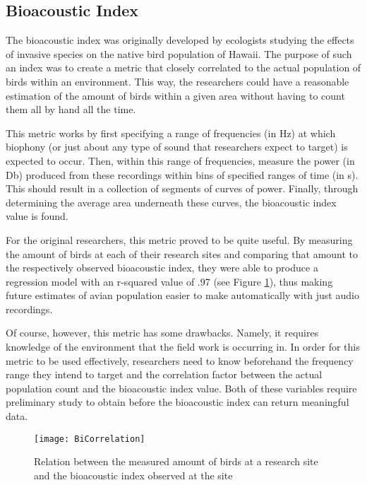 \subsection{Bioacoustic Index}
The bioacoustic index was originally developed by ecologists studying the effects of invasive species on the native bird population of Hawaii. The purpose of such an index was to create a metric that closely correlated to the actual population of birds within an environment. This way, the researchers could have a reasonable estimation of the amount of birds within a given area without having to count them all by hand all the time.\par
This metric works by first specifying a range of frequencies (in Hz) at which biophony (or just about any type of sound that researchers expect to target) is expected to occur. Then, within this range of frequencies, measure the power (in Db) produced from these recordings within bins of specified ranges of time (in s). This should result in a collection of segments of curves of power. Finally, through determining the average area underneath these curves, the bioacoustic index value is found.\par
For the original researchers, this metric proved to be quite useful. By measuring the amount of birds at each of their research sites and comparing that amount to the respectively observed bioacoustic index, they were able to produce a regression model with an r-squared value of .97 (see Figure \ref{fig:BiCorrelation}), thus making future estimates of avian population easier to make automatically with just audio recordings.\cite{boelman}\par
Of course, however, this metric has some drawbacks. Namely, it requires knowledge of the environment that the field work is occurring in. In order for this metric to be used effectively, researchers need to know beforehand the frequency range they intend to target and the correlation factor between the actual population count and the bioacoustic index value. Both of these variables require preliminary study to obtain before the bioacoustic index can return meaningful data.\par
\begin{figure}
  \begin{center}
    \texttt{[image: BiCorrelation]}
  \end{center}
  \caption{Relation between the measured amount of birds at a research site and the bioacoustic index observed at the site}
  \label{fig:BiCorrelation}
\end{figure}
